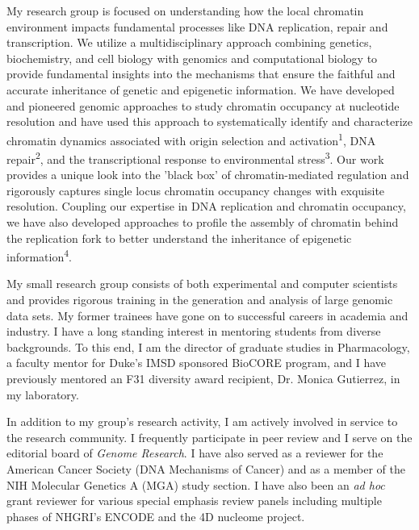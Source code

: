 \begin{statement}
My research group is focused on understanding how the local chromatin environment impacts fundamental processes like DNA replication, repair and transcription. We utilize a multidisciplinary approach combining genetics, biochemistry, and cell biology with genomics and computational biology to provide fundamental insights into the mechanisms that ensure the faithful and accurate inheritance of genetic and epigenetic information.  We have developed and pioneered genomic approaches to study chromatin occupancy at nucleotide resolution and have used this approach to systematically identify and characterize chromatin dynamics associated with origin selection and activation\textsuperscript{1}, DNA repair\textsuperscript{2}, and the transcriptional response to environmental stress\textsuperscript{3}.  Our work provides a unique look into the 'black box' of chromatin-mediated regulation and rigorously captures single locus chromatin occupancy changes with exquisite resolution.  Coupling our expertise in DNA replication and chromatin occupancy, we have also developed approaches to profile the assembly of chromatin behind the replication fork to better understand the inheritance of epigenetic information\textsuperscript{4}.  

My small research group consists of both experimental and computer scientists and provides rigorous training in the generation and analysis of large genomic data sets. My former trainees have gone on to successful careers in academia and industry.  I have a long standing interest in mentoring students from diverse backgrounds.  To this end, I am the director of graduate studies in Pharmacology, a faculty mentor for Duke's IMSD sponsored BioCORE program, and I have previously mentored an F31 diversity award recipient, Dr. Monica Gutierrez, in my laboratory.

In addition to my group's research activity, I am actively involved in service to the research community.  I frequently participate in peer review and I serve on the editorial board of \textit{Genome Research}.  I have also served as a reviewer for the American Cancer Society (DNA Mechanisms of Cancer) and as a member of the NIH Molecular Genetics A (MGA) study section.  I have also been an \textit{ad hoc} grant reviewer for various special emphasis review panels including multiple phases of NHGRI's ENCODE and the 4D nucleome project. 
\newpage

\begin{enumerate}


\end{enumerate}
\end{statement}
